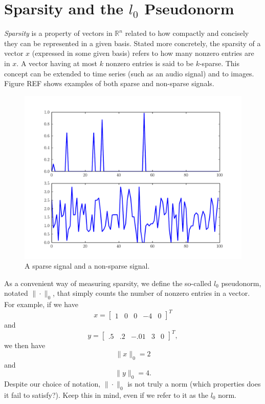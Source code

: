\section*{Sparsity and the $l_0$ Pseudonorm}
\emph{Sparsity} is a property of vectors in $\mathbb{R}^n$ related to how compactly and concisely they can
be represented in a given basis. Stated more concretely, the sparsity of a vector $x$ (expressed in some given
basis) refers to how many nonzero entries are in $x$. A vector having at most $k$ nonzero entries is said to be
$k$-sparse. This concept can be extended to time series (such as an audio signal) and to images. Figure REF shows
examples of both sparse and non-sparse signals.

\begin{figure}
\centering
\includegraphics[width=\textwidth]{sparse.pdf}
\caption{A sparse signal and a non-sparse signal.}
\label{fig:sparse}
\end{figure}

As a convenient way of measuring sparsity, we define the so-called $l_0$ pseudonorm, notated $\|\cdot\|_0$,
that simply counts the number of nonzero entries in a vector. For example, if we have
\[
x =
\begin{bmatrix}
1&0&0&-4&0
\end{bmatrix}^T
\]
and
\[
y =
\begin{bmatrix}
.5&.2&-.01&3&0
\end{bmatrix}^T,
\]
we then have
\[
\|x\|_0 = 2
\]
and
\[
\|y\|_0 = 4.
\]
Despite our choice of notation, $\|\cdot\|_0$ is not truly a norm (which properties does it fail to satisfy?).
Keep this in mind, even if we refer to it as the $l_0$ norm.

